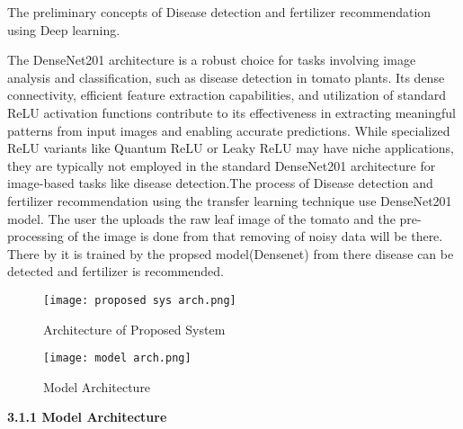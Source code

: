 \documentclass[12pt, English]{article}
\begin{document}
\begin{normalsize}
 The preliminary concepts of Disease detection and fertilizer recommendation using Deep learning.

  The DenseNet201 architecture is a robust choice for tasks involving image analysis and classification, such as disease detection in tomato plants. Its dense connectivity, efficient feature extraction capabilities, and utilization of standard ReLU activation functions contribute to its effectiveness in extracting meaningful patterns from input images and enabling accurate predictions. While specialized ReLU variants like Quantum ReLU or Leaky ReLU may have niche applications, they are typically not employed in the standard DenseNet201 architecture for image-based tasks like disease detection.The process of Disease detection and fertilizer recommendation using the transfer learning technique use DenseNet201 model.
 The user the uploads the raw leaf image of the tomato and the pre-processing of the image is done from that removing of noisy  data will be there. There by  it is trained by the propsed model(Densenet) from there disease can be detected and fertilizer is recommended.
\\
\begin{figure}[htb]
\begin{center}
\texttt{[image: proposed sys arch.png]}
\end{center}
\begin{center}
\renewcommand{\thefigure}{3.1.1}
\caption{\footnotesize Architecture of Proposed System}
\end{center}
\end{figure}


\begin{figure}[htb]
\begin{center}
\texttt{[image: model arch.png]}
\end{center}
\begin{center}
\renewcommand{\thefigure}{3.1.1.1}
\caption{\footnotesize Model Architecture}
\end{center}
\end{figure}


\textbf{3.1.1 Model Architecture}\\


\end{normalsize}
\end{document}
